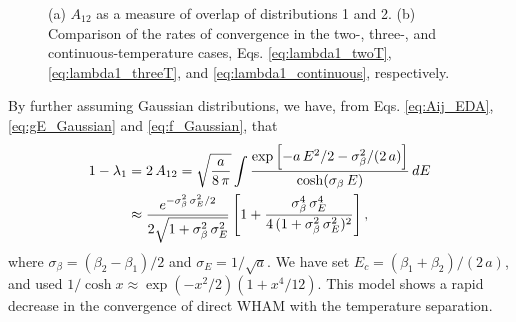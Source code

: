 \documentclass[reprint,aip,jcp,superscriptaddress]{revtex4-1}
\begin{document}
\begin{figure}[h]
  \caption{\label{fig:gausconv}
    (a) $A_{12}$ as a measure of overlap
    of distributions 1 and 2.
    (b) Comparison of the rates of convergence
    in the two-, three-,
    and continuous-temperature cases,
    Eqs. \eqref{eq:lambda1_twoT},
    \eqref{eq:lambda1_threeT},
    and
    \eqref{eq:lambda1_continuous},
    respectively.
  }
\end{figure}



By further assuming Gaussian distributions,
we have, from
Eqs. \eqref{eq:Aij_EDA},
\eqref{eq:gE_Gaussian}
and \eqref{eq:f_Gaussian},
that
%
\begin{align}
1 - \lambda_1
&= 2 \, A_{12}
=
\sqrt \frac{ a } { 8 \, \pi }
\int
\frac
{
  \exp\left[
    -a \, E^2/2
    -\sigma_\beta^2 / (2 \, a)
  \right]
}
{ \cosh( \sigma_\beta \, E ) }
\, dE
\notag \\
&\approx\frac{ e^{-\sigma_\beta^2 \, \sigma_E^2/2} }
{ 2 \sqrt{ 1 + \sigma_\beta^2 \, \sigma_E^2 } }
\left[
  1 + \frac{ \sigma_\beta^4 \, \sigma_E^4 }
  {4\,(1 + \sigma_\beta^2 \, \sigma_E^2)^2 }
\right],
\label{eq:lambda1_twoT}
\end{align}
%
where
$\sigma_\beta = (\beta_2 - \beta_1)/2$
and
$\sigma_E = 1/\sqrt{a}$.
%
We have set
$E_c = (\beta_1 + \beta_2)/(2 \, a)$,
and used
$1/\cosh x \approx \exp(-x^2/2)(1 + x^4/12)$.
%
This model shows
a rapid decrease in
the convergence of direct WHAM
with the temperature separation.
\end{document}
